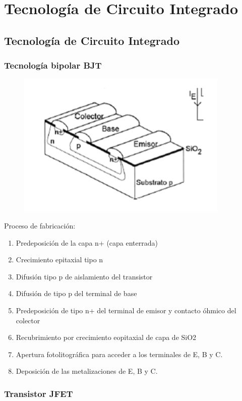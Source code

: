 \chapter{Tecnología de Circuito Integrado}

\section{Tecnología de Circuito Integrado}
\subsection{Tecnología bipolar BJT}

\begin{figure}[H]
    \centering
    \includegraphics[width=0.5\linewidth]{Imagenes/Tecnologia de CI - BJT.png}
\end{figure}

Proceso de fabricación:

\begin{enumerate}
    \item Predeposición de la capa n+ (capa enterrada)
    \item Crecimiento epitaxial tipo n
    \item Difusión tipo p de aislamiento del transistor
    \item Difusión de tipo p del terminal de base
    \item Predeposición de tipo n+ del terminal de emisor y contacto óhmico del colector
    \item Recubrimiento por crecimiento eopitaxial de capa de SiO2
    \item Apertura fotolitográfica para acceder a los terminales de E, B y C.
    \item Deposición de las metalizaciones de E, B y C.
\end{enumerate}

\subsection{Transistor JFET}


